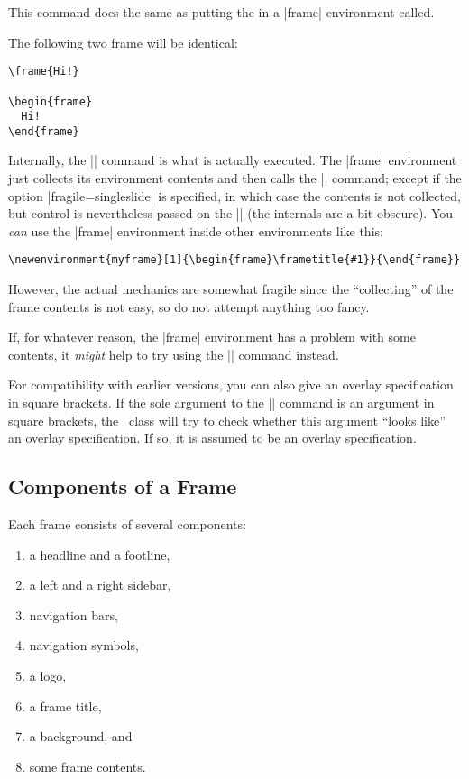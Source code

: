\begin{command}{\frame{}%
    }
  This command does the same as putting the  in a
  |frame| environment called.

  \example The following two frame will be identical:
\begin{verbatim}
\frame{Hi!}

\begin{frame}
  Hi!
\end{frame}
\end{verbatim}
\end{command}

Internally, the |\frame| command is what is actually executed. The
|frame| environment just collects its environment contents and then
calls the |\frame| command; except if the option |fragile=singleslide|
is specified, in which case the contents is not collected, but
control is nevertheless passed on the |\frame| (the internals are a
bit obscure). You \emph{can} use the |frame| environment inside other
environments like this:
\begin{verbatim}
\newenvironment{myframe}[1]{\begin{frame}\frametitle{#1}}{\end{frame}}
\end{verbatim}
However, the actual mechanics are somewhat fragile since the
``collecting'' of the frame contents is not easy, so
do not attempt anything too fancy.

If, for whatever reason, the |frame| environment has a problem with
some contents, it \emph{might} help to try using the |\frame|
command instead.

For compatibility with earlier versions, you can also give an overlay
specification in square brackets. If the sole argument to the |\frame|
command is an argument in square brackets, the \beamer\ class will try
to check whether this argument ``looks like'' an overlay
specification. If so, it is assumed to be an overlay specification.



\subsection{Components of a Frame}

Each frame consists of several components:
\begin{enumerate}\itemsep=0pt\parskip=0pt
\item a headline and a footline,
\item a left and a right sidebar,
\item navigation bars,
\item navigation symbols,
\item a logo,
\item a frame title, 
\item a background, and
\item some frame contents.
\end{enumerate}

